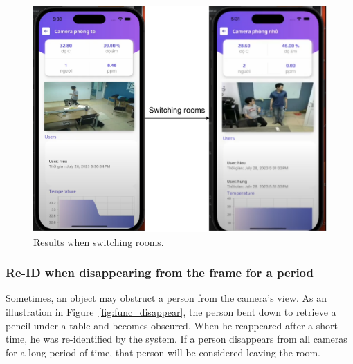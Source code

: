 \documentclass[../main.tex]{subfiles}
\begin{document}
\begin{figure}[h!]
\centering
\includegraphics[width=\linewidth]{Figure/func_switch.pdf}
\caption{Results when switching rooms.}
\label{fig:func_switch}
\end{figure}

\subsubsection{Re-ID when disappearing from the frame for a period}
Sometimes, an object may obstruct a person from the camera's view. As an illustration in Figure~\ref{fig:func_disappear}, the person bent down to retrieve a pencil under a table and becomes obscured. When he reappeared after a short time, he was re-identified by the system. If a person disappears from all cameras for a long period of time, that person will be considered leaving the room.
\end{document}
